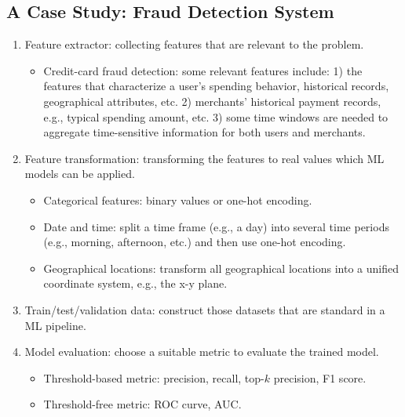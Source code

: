 

\subsection{A Case Study: Fraud Detection System}
    \begin{enumerate}
        \item Feature extractor: collecting features that are relevant to the problem.
            \begin{itemize}
                \item Credit-card fraud detection: some relevant features include: 1) the features that characterize a user's spending behavior, historical records, geographical attributes, etc. 2) merchants' historical payment records, e.g., typical spending amount, etc. 3) some time windows are needed to aggregate time-sensitive information for both users and merchants. 
            \end{itemize}
        \item Feature transformation: transforming the features to real values which ML models can be applied.
            \begin{itemize}
                \item Categorical features: binary values or one-hot encoding. 
                \item Date and time: split a time frame (e.g., a day) into several time periods (e.g., morning, afternoon, etc.) and then use one-hot encoding. 
                \item Geographical locations: transform all geographical locations into a unified coordinate system, e.g., the x-y plane.
            \end{itemize}
        \item Train/test/validation data: construct those datasets that are standard in a ML pipeline. 
        \item Model evaluation: choose a suitable metric to evaluate the trained model.
            \begin{itemize}
                \item Threshold-based metric: precision, recall, top-$k$ precision, F1 score.
                \item Threshold-free metric: ROC curve, AUC.
            \end{itemize}
    \end{enumerate}